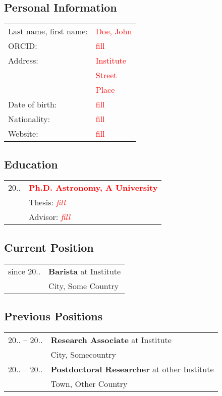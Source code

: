 \documentclass[COG,11pt]{ercgrant}
\begin{document}
\subsection{Personal Information}
\begin{tabular}{p{5cm}l}
	Last name, first name: & \textcolor{red}{Doe, John} \\
	ORCID:                 & \textcolor{red}{fill}      \\
	Address:               & \textcolor{red}{Institute} \\
	                       & \textcolor{red}{Street}    \\
	                       & \textcolor{red}{Place}     \\
	Date of birth:         & \textcolor{red}{fill}      \\
	Nationality:           & \textcolor{red}{fill}      \\
	Website:               & \textcolor{red}{fill}      \\
\end{tabular}

\subsection{Education}
\color{red}
\begin{tabular}{p{2cm}p{12cm}}
	20..
	 & \textbf{\textcolor{red}{Ph.D. Astronomy, A University}} \\
	 & Thesis: \textit{\textcolor{red}{fill}}                  \\
	 & Advisor: \textit{\textcolor{red}{fill}}
\end{tabular}
\color{black}

\subsection{Current Position}
\color{red}
\begin{tabular}{p{2cm}p{12cm}}
	since 20..
	 & \textbf{Barista} at Institute \\
	 & City, Some Country
\end{tabular}
\color{black}

\subsection{Previous Positions}
\color{red}
\begin{tabular}{p{2cm}p{12cm}}
	20.. -- 20..
	             & \textbf{Research Associate} at Institute            \\
	             & City, Somecountry                                   \\
	20.. -- 20.. & \textbf{Postdoctoral Researcher} at other Institute \\
	             & Town, Other Country                                 \\
\end{tabular}
\color{black}
\end{document}
